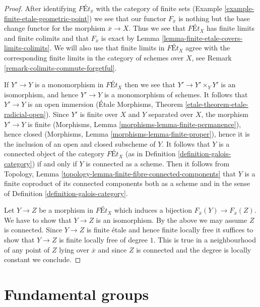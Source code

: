 \documentclass{stacks-project}
\theoremstyle{plain}
\theoremstyle{definition}
\theoremstyle{remark}
\numberwithin{equation}{subsection}
\begin{document}
\begin{proof}
After identifying $\textit{F\'Et}_{\overline{x}}$ with the category of
finite sets (Example \ref{example-finite-etale-geometric-point})
we see that our functor $F_{\overline{x}}$
is nothing but the base change functor for the morphism $\overline{x} \to X$.
Thus we see that $\textit{F\'Et}_X$ has finite limits and finite colimits
and that $F_{\overline{x}}$ is exact by
Lemma \ref{lemma-finite-etale-covers-limits-colimits}.
We will also use that finite limits in $\textit{F\'Et}_X$
agree with the corresponding finite limits in the category
of schemes over $X$, see Remark \ref{remark-colimits-commute-forgetful}.

\medskip\noindent
If $Y' \to Y$ is a monomorphism in $\textit{F\'Et}_X$
then we see that $Y' \to Y' \times_Y Y'$ is an isomorphism, and
hence $Y' \to Y$ is a monomorphism of schemes. It follows that
$Y' \to Y$ is an open immersion
(\'Etale Morphisms, Theorem \ref{etale-theorem-etale-radicial-open}). Since
$Y'$ is finite over $X$ and $Y$ separated over $X$,
the morphism $Y' \to Y$ is finite
(Morphisms, Lemma \ref{morphisms-lemma-finite-permanence}), hence closed
(Morphisms, Lemma \ref{morphisms-lemma-finite-proper}),
hence it is the inclusion of an open and closed subscheme of $Y$.
It follows that $Y$ is a connected object of the category
$\textit{F\'Et}_X$ (as in Definition \ref{definition-galois-category})
if and only if $Y$ is connected as a scheme. Then it follows from
Topology, Lemma \ref{topology-lemma-finite-fibre-connected-components}
that $Y$ is a finite coproduct of its connected components
both as a scheme and in the sense of
Definition \ref{definition-galois-category}.

\medskip\noindent
Let $Y \to Z$ be a morphism in $\textit{F\'Et}_X$ which induces a
bijection $F_{\overline{x}}(Y) \to F_{\overline{x}}(Z)$. We have to
show that $Y \to Z$ is an isomorphism. By the above we may assume
$Z$ is connected. Since $Y \to Z$ is finite \'etale and hence finite
locally free it suffices to show that $Y \to Z$ is finite locally
free of degree $1$. This is true in a neighbourhood of any point of
$Z$ lying over $\overline{x}$ and since $Z$ is connected and
the degree is locally constant we conclude.
\end{proof}



\section{Fundamental groups}
\label{section-fundamental-groups}
\end{document}
